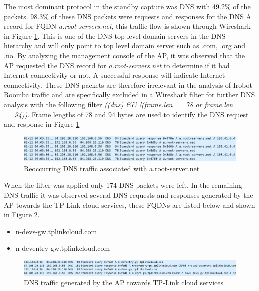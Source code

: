 The most dominant protocol in the standby capture was \gls{DNS} with 49.2\% of the packets. 98.3\% of these \gls{DNS} packets were requests and responses for the \gls{DNS} A record for \gls{FQDN} \textit{a.root-servers.net}, this traffic flow is shown through Wireshark in Figure \ref{fig:dns_a-root}. This is one of the \gls{DNS} top level domain servers in the \gls{DNS} hierarchy and will only point to top level domain server such as .com, .org and .no. By analyzing the management console of the AP, it was observed that the \gls{AP} requested the \gls{DNS} record for \textit{a.root-servers.net} to determine if it had Internet connectivity or not. A successful response will indicate Internet connectivity. These \gls{DNS} packets are therefore irrelevant in the analysis of Irobot Roomba traffic and are specifically excluded in a Wireshark filter for further \gls{DNS} analysis with the following filter  \textit{((dns) \&\& !(frame.len ==78 or frame.len ==94))}. Frame lengths of 78 and 94 bytes are used to identify the \gls{DNS} request and response in Figure  \ref{fig:dns_a-root}

\begin{figure}[H]
    \centering
    \includegraphics[width=\textwidth]{figures/DNS_a-root.png}
    \caption{Reoccurring DNS traffic associated with a.root-server.net}
    \label{fig:dns_a-root}
\end{figure}

When the filter was applied only 174 \gls{DNS} packets were left. In the remaining \gls{DNS} traffic it was observed several \gls{DNS} requests and responses generated by the \gls{AP} towards the TP-Link cloud services, these \gls{FQDN}s are listed below and shown in Figure \ref{fig:tp-link_fqdn}. 

\begin{itemize}
    \item n-devs-gw.tplinkcloud.com
    \item n-deventry-gw.tplinkcloud.com
\end{itemize}

\begin{figure}[H]
    \centering
    \includegraphics[width=\textwidth]{figures/DNS-tp-link.png}
    \caption{DNS traffic generated by the \gls{AP} towards TP-Link cloud services}
    \label{fig:tp-link_fqdn}
\end{figure}


